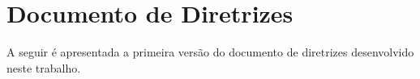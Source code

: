 \chapter{Documento de Diretrizes} \label{app:plano-testes-base}

A seguir é apresentada a primeira versão do documento de diretrizes desenvolvido neste trabalho.




